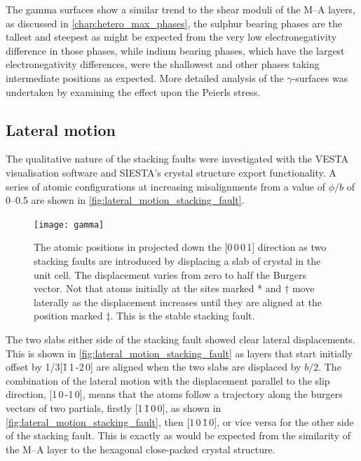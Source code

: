 The gamma surfaces show a similar trend to the shear moduli of the M--A layers, as discussed in \autoref{chap:hetero_max_phases}, the sulphur bearing phases are the tallest and steepest as might be expected from the very low electronegativity difference in those phases, while indium bearing phases, which have the largest electronegativity differences, were the shallowest and other phases taking intermediate positions as expected. More detailed analysis of the $\gamma$-surfaces was undertaken by examining the effect upon the Peierls stress.


\subsection{Lateral motion}



The qualitative nature of the stacking faults were investigated with the VESTA visualisation software and SIESTA's crystal structure export functionality. A series of atomic configurations at increasing misalignments from a value of $\phi/b$ of \numrange{0}{0.5} are shown in \autoref{fig:lateral_motion_stacking_fault}.


\begin{figure}[!ht]
\centering
\texttt{[image: gamma]}
\caption[Atomic configurations around stacking faults.]{The atomic positions in  projected down the [0\,0\,0\,1] direction as two stacking faults are introduced by displacing a slab of crystal in the unit cell. The displacement varies from zero to half the Burgers vector. Not that atoms initially at the sites marked * and $\dagger$ move laterally as the displacement increases until they are aligned at the position marked $\ddagger$. This is the stable stacking fault. \label{fig:lateral_motion_stacking_fault}}
\end{figure}




The two slabs either side of the stacking fault showed clear lateral displacements. This is shown in \autoref{fig:lateral_motion_stacking_fault} as layers that start initially  offset by 1/3[\={1}\,1\,-2\,0] are aligned when the two slabs are displaced by $b/2$. The combination of the lateral motion with the displacement parallel to the slip direction, [1\,0\,-1\,0], means that the atoms follow a trajectory along the burgers vectors of two partials, 
 firstly [1\,\={1}\,0\,0], as shown in \autoref{fig:lateral_motion_stacking_fault}, then [1\,0\,\={1}\,0], or vice versa for the other side of the stacking fault. This is exactly as would be expected from the similarity of the M--A layer to the hexagonal close-packed crystal structure. 





